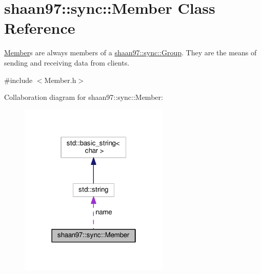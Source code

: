 \hypertarget{classshaan97_1_1sync_1_1_member}{}\section{shaan97\+:\+:sync\+:\+:Member Class Reference}
\label{classshaan97_1_1sync_1_1_member}


{\ttfamily \hyperlink{classshaan97_1_1sync_1_1_member}{Member}}s are always members of a {\ttfamily \hyperlink{classshaan97_1_1sync_1_1_group}{shaan97\+::sync\+::\+Group}}. They are the means of sending and receiving data from clients.  




{\ttfamily \#include $<$Member.\+h$>$}



Collaboration diagram for shaan97\+:\+:sync\+:\+:Member\+:\nopagebreak
\begin{figure}[H]
\begin{center}
\leavevmode
\includegraphics[width=202pt]{classshaan97_1_1sync_1_1_member__coll__graph}
\end{center}
\end{figure}
